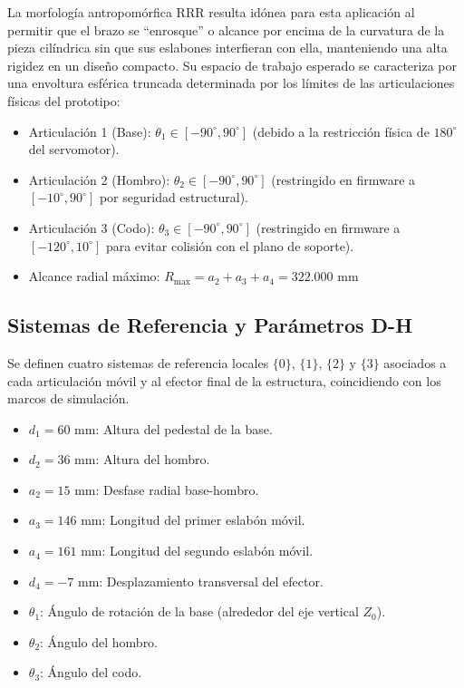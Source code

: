 \documentclass[conference,a4paper]{IEEEtran}
\begin{document}
La morfología antropomórfica RRR resulta idónea para esta aplicación al permitir que el brazo se ``enrosque'' o alcance por encima de la curvatura de la pieza cilíndrica sin que sus eslabones interfieran con ella, manteniendo una alta rigidez en un diseño compacto. Su espacio de trabajo esperado se caracteriza por una envoltura esférica truncada determinada por los límites de las articulaciones físicas del prototipo:
\begin{itemize}
    \item Articulación 1 (Base): $\theta_1 \in [-90^\circ, 90^\circ]$ (debido a la restricción física de $180^\circ$ del servomotor).
    \item Articulación 2 (Hombro): $\theta_2 \in [-90^\circ, 90^\circ]$ (restringido en firmware a $[-10^\circ, 90^\circ]$ por seguridad estructural).
    \item Articulación 3 (Codo): $\theta_3 \in [-90^\circ, 90^\circ]$ (restringido en firmware a $[-120^\circ, 10^\circ]$ para evitar colisión con el plano de soporte).
    \item Alcance radial máximo: $R_{\text{max}} = a_2 + a_3 + a_4 = 322.000\text{ mm}$
\end{itemize}

\subsection{Sistemas de Referencia y Parámetros D-H}
Se definen cuatro sistemas de referencia locales $\{0\}$, $\{1\}$, $\{2\}$ y $\{3\}$ asociados a cada articulación móvil y al efector final de la estructura, coincidiendo con los marcos de simulación.
\begin{itemize}
    \item $d_1 = 60\text{ mm}$: Altura del pedestal de la base.
    \item $d_2 = 36\text{ mm}$: Altura del hombro.
    \item $a_2 = 15\text{ mm}$: Desfase radial base-hombro.
    \item $a_3 = 146\text{ mm}$: Longitud del primer eslabón móvil.
    \item $a_4 = 161\text{ mm}$: Longitud del segundo eslabón móvil.
    \item $d_4 = -7\text{ mm}$: Desplazamiento transversal del efector.
    \item $\theta_1$: Ángulo de rotación de la base (alrededor del eje vertical $Z_0$).
    \item $\theta_2$: Ángulo del hombro.
    \item $\theta_3$: Ángulo del codo.
\end{itemize}
\end{document}
